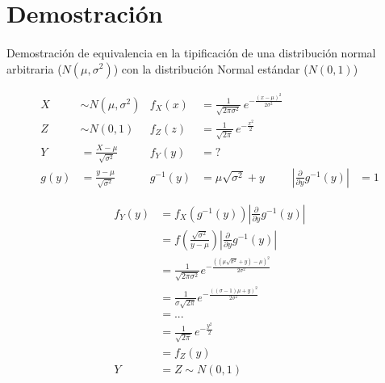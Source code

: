 \documentclass{article}
\begin{document}
	\maketitle
  \thispagestyle{empty}

  \section{Demostración}
  \label{sec:demostration}

    \paragraph{}
    Demostración de equivalencia en la tipificación de una distribución normal arbitraria ($N(\mu,\sigma^2)$) con la distribución Normal estándar ($N(0,1)$)

    \begin{align}
      X &\sim N(\mu,\sigma^2) & f_X(x) &= {\displaystyle {\frac {1}{\sqrt {2\pi \sigma ^{2}}}}\,e^{-{\frac {(x-\mu )^{2}}{2\sigma ^{2}}}}}\\
      Z &\sim N(0,1) & f_Z(z) &= {\displaystyle {\frac {1}{\sqrt {2\pi}}}\,e^{-{\frac {x^{2}}{2}}}} \\
      Y &= \frac{X-\mu}{\sqrt{\sigma^2}} & f_Y(y)&=? \\
      g(y) &= \frac{y-\mu}{\sqrt{\sigma^2}} & g^{-1}(y) &= \mu\sqrt{\sigma^2} + y &\left| \frac{\partial}{\partial y} g^{-1} (y) \right| &= 1
    \end{align}

    \begin{align}
      f_Y(y)  &= f_X \left( g^{-1} (y) \right) \left| \frac{\partial}{\partial y} g^{-1} (y) \right| \\
            &= f(\frac{\sqrt{\sigma^2}}{y-\mu}) \left| \frac{\partial}{\partial y} g^{-1} (y) \right|\\
            &= \frac{1}{\sqrt{2\pi\sigma^2}}e^{-{\frac{((\mu\sqrt{\sigma^2} + y)-\mu )^2}{2\sigma^2}}} \\
            &= \frac{1}{\sigma \sqrt{2 \pi} }e^{ -{ \frac{( (\sigma - 1) \mu + y)^2}{2\sigma^2}}} \\
            &= ... \\
            &={\displaystyle {\frac {1}{\sqrt {2\pi}}}\,e^{-{\frac {y^{2}}{2}}}}\\
            &=f_Z(y) \\
      Y &= Z \sim N(0,1)
    \end{align}
	\nocite{prob2017}

  
  
\end{document}
